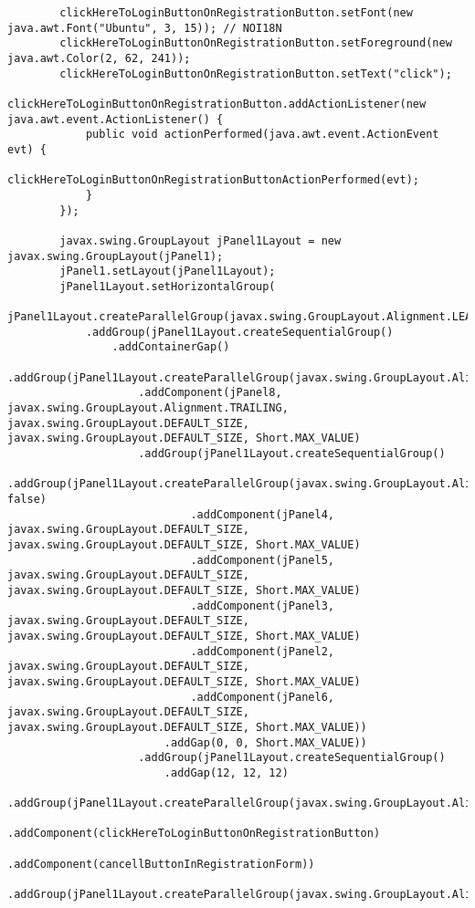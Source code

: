 \documentclass[12pt,a4paper]{article}
\begin{document}
\begin{lstlisting}
        clickHereToLoginButtonOnRegistrationButton.setFont(new java.awt.Font("Ubuntu", 3, 15)); // NOI18N
        clickHereToLoginButtonOnRegistrationButton.setForeground(new java.awt.Color(2, 62, 241));
        clickHereToLoginButtonOnRegistrationButton.setText("click");
        clickHereToLoginButtonOnRegistrationButton.addActionListener(new java.awt.event.ActionListener() {
            public void actionPerformed(java.awt.event.ActionEvent evt) {
                clickHereToLoginButtonOnRegistrationButtonActionPerformed(evt);
            }
        });

        javax.swing.GroupLayout jPanel1Layout = new javax.swing.GroupLayout(jPanel1);
        jPanel1.setLayout(jPanel1Layout);
        jPanel1Layout.setHorizontalGroup(
            jPanel1Layout.createParallelGroup(javax.swing.GroupLayout.Alignment.LEADING)
            .addGroup(jPanel1Layout.createSequentialGroup()
                .addContainerGap()
                .addGroup(jPanel1Layout.createParallelGroup(javax.swing.GroupLayout.Alignment.LEADING)
                    .addComponent(jPanel8, javax.swing.GroupLayout.Alignment.TRAILING, javax.swing.GroupLayout.DEFAULT_SIZE, javax.swing.GroupLayout.DEFAULT_SIZE, Short.MAX_VALUE)
                    .addGroup(jPanel1Layout.createSequentialGroup()
                        .addGroup(jPanel1Layout.createParallelGroup(javax.swing.GroupLayout.Alignment.LEADING, false)
                            .addComponent(jPanel4, javax.swing.GroupLayout.DEFAULT_SIZE, javax.swing.GroupLayout.DEFAULT_SIZE, Short.MAX_VALUE)
                            .addComponent(jPanel5, javax.swing.GroupLayout.DEFAULT_SIZE, javax.swing.GroupLayout.DEFAULT_SIZE, Short.MAX_VALUE)
                            .addComponent(jPanel3, javax.swing.GroupLayout.DEFAULT_SIZE, javax.swing.GroupLayout.DEFAULT_SIZE, Short.MAX_VALUE)
                            .addComponent(jPanel2, javax.swing.GroupLayout.DEFAULT_SIZE, javax.swing.GroupLayout.DEFAULT_SIZE, Short.MAX_VALUE)
                            .addComponent(jPanel6, javax.swing.GroupLayout.DEFAULT_SIZE, javax.swing.GroupLayout.DEFAULT_SIZE, Short.MAX_VALUE))
                        .addGap(0, 0, Short.MAX_VALUE))
                    .addGroup(jPanel1Layout.createSequentialGroup()
                        .addGap(12, 12, 12)
                        .addGroup(jPanel1Layout.createParallelGroup(javax.swing.GroupLayout.Alignment.TRAILING)
                            .addComponent(clickHereToLoginButtonOnRegistrationButton)
                            .addComponent(cancellButtonInRegistrationForm))
                        .addGroup(jPanel1Layout.createParallelGroup(javax.swing.GroupLayout.Alignment.LEADING)

\end{lstlisting}
\end{document}
